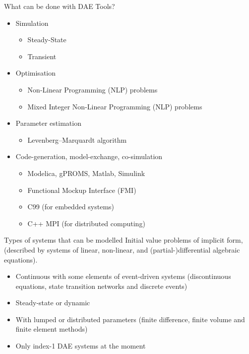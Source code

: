 \documentclass[compress,newPxFont,sthlmFooter]{beamer}
\begin{document}
\begin{frame}{What can be done with DAE Tools?} 
\begin{itemize}
  \item Simulation
    \begin{itemize}
      \item Steady-State 
      \item Transient
    \end{itemize}
  \item Optimisation
    \begin{itemize}
      \item Non-Linear Programming (NLP) problems
      \item Mixed Integer Non-Linear Programming (NLP) problems
    \end{itemize}
  \item Parameter estimation
    \begin{itemize}
      \item Levenberg–Marquardt algorithm
    \end{itemize}
  \item Code-generation, model-exchange, co-simulation 
    \begin{itemize}
      \item Modelica, gPROMS, Matlab, Simulink
      \item Functional Mockup Interface (FMI)
      \item C99 (for embedded systems)
      \item C++ MPI (for distributed computing) 
    \end{itemize}
\end{itemize}
\end{frame}

\begin{frame}{Types of systems that can be modelled}
  \alert{Initial value problems of implicit form}, 
  (described by systems of linear, non-linear, and (partial-)differential algebraic equations).
\begin{itemize}
  \item \alert{Continuous} with some elements of \alert{event-driven} systems 
        (discontinuous equations, state transition networks and discrete events) 
  \item \alert{Steady-state} or \alert{dynamic}
  \item With \alert{lumped} or \alert{distributed} parameters 
        (finite difference, finite volume and finite element methods)
  \item Only \alert{index-1} DAE systems at the moment
\end{itemize}
\end{frame}
\end{document}
